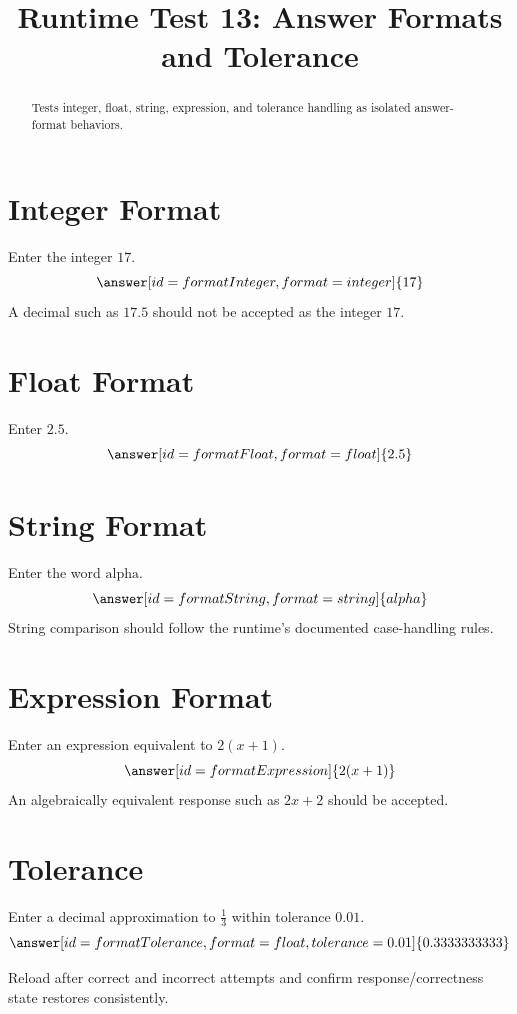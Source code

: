 \documentclass{ximera}
\title{Runtime Test 13: Answer Formats and Tolerance}
\begin{document}
\begin{abstract}
Tests integer, float, string, expression, and tolerance handling as isolated
answer-format behaviors.
\end{abstract}
\maketitle

\section{Integer Format}

\begin{problem}
Enter the integer \(17\).
\[
\answer[id=formatInteger,format=integer]{17}
\]
A decimal such as \(17.5\) should not be accepted as the integer \(17\).
\end{problem}

\section{Float Format}

\begin{problem}
Enter \(2.5\).
\[
\answer[id=formatFloat,format=float]{2.5}
\]
\end{problem}

\section{String Format}

\begin{problem}
Enter the word \(\text{alpha}\).
\[
\answer[id=formatString,format=string]{alpha}
\]
String comparison should follow the runtime's documented case-handling rules.
\end{problem}

\section{Expression Format}

\begin{problem}
Enter an expression equivalent to \(2(x+1)\).
\[
\answer[id=formatExpression]{2(x+1)}
\]
An algebraically equivalent response such as \(2x+2\) should be accepted.
\end{problem}

\section{Tolerance}

\begin{problem}
Enter a decimal approximation to \(\frac{1}{3}\) within tolerance \(0.01\).
\[
\answer[id=formatTolerance,format=float,tolerance=0.01]{0.3333333333}
\]
\end{problem}

Reload after correct and incorrect attempts and confirm response/correctness state
restores consistently.
\end{document}
